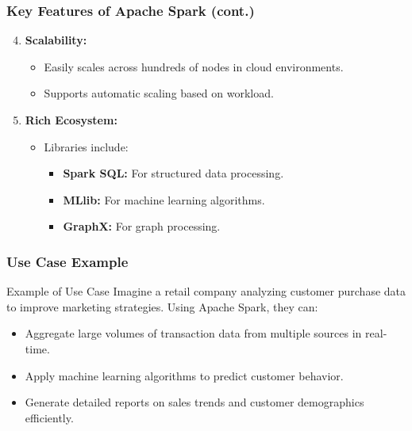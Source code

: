 \documentclass[aspectratio=169]{beamer}
\begin{document}
\begin{frame}[fragile]
    \frametitle{Key Features of Apache Spark (cont.)}
    \begin{enumerate}
        \setcounter{enumi}{3}
        \item \textbf{Scalability:}
        \begin{itemize}
            \item Easily scales across hundreds of nodes in cloud environments.
            \item Supports automatic scaling based on workload.
        \end{itemize}

        \item \textbf{Rich Ecosystem:}
        \begin{itemize}
            \item Libraries include:
            \begin{itemize}
                \item \textbf{Spark SQL:} For structured data processing.
                \item \textbf{MLlib:} For machine learning algorithms.
                \item \textbf{GraphX:} For graph processing.
            \end{itemize}
        \end{itemize}
    \end{enumerate}
\end{frame}

\begin{frame}[fragile]
    \frametitle{Use Case Example}
    \begin{block}{Example of Use Case}
        Imagine a retail company analyzing customer purchase data to improve marketing strategies. Using Apache Spark, they can:
        \begin{itemize}
            \item Aggregate large volumes of transaction data from multiple sources in real-time.
            \item Apply machine learning algorithms to predict customer behavior.
            \item Generate detailed reports on sales trends and customer demographics efficiently.
        \end{itemize}
    \end{block}
\end{frame}
\end{document}

